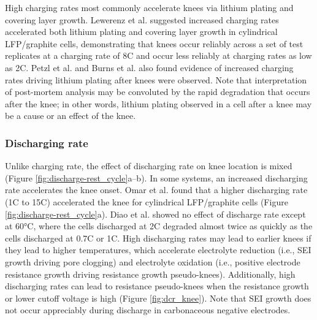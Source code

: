 \documentclass[journal=jpclcd,manuscript=article]{achemso}
\begin{document}
High charging rates most commonly accelerate knees via lithium plating and covering layer growth. Lewerenz et al.\cite{lewerenz_systematic_2017,lewerenz_post-mortem_2017} suggested increased charging rates accelerated both lithium plating and covering layer growth in cylindrical LFP/graphite cells, demonstrating that knees occur reliably across a set of test replicates at a charging rate of 8C and occur less reliably at charging rates as low as 2C. Petzl et al.\cite{petzl_lithium_2015} and Burns et al.\cite{burns_-situ_2015} also found evidence of increased charging rates driving lithium plating after knees were observed. Note that interpretation of post-mortem analysis may be convoluted by the rapid degradation that occurs after the knee; in other words, lithium plating observed in a cell after a knee may be a cause or an effect of the knee.

\subsubsection{Discharging rate}

Unlike charging rate, the effect of discharging rate on knee location is mixed (Figure \ref{fig:discharge-rest_cycle}a--b).
In some systems, an increased discharging rate
accelerates the knee onset.
Omar et al.\cite{omar_lithium_2014} found that a higher discharging rate (1C to 15C) accelerated the knee for cylindrical LFP/graphite cells (Figure \ref{fig:discharge-rest_cycle}a).
Diao et al.\cite{diao_accelerated_2019} showed no effect of discharge rate except at 60°C, where the cells discharged at 2C degraded almost twice as quickly as the cells discharged at 0.7C or 1C.
High discharging rates may lead to earlier knees if they lead to higher temperatures, which accelerate electrolyte reduction (i.e., SEI growth driving pore clogging) and electrolyte oxidation (i.e., positive electrode resistance growth driving resistance growth pseudo-knees). Additionally, high discharging rates can lead to resistance pseudo-knees when the resistance growth or lower cutoff voltage is high (Figure \ref{fig:dcr_knee}).\cite{ma_editors_2019, mandli_analysis_2019}
Note that SEI growth does not occur appreciably during discharge in carbonaceous negative electrodes\cite{attia_electrochemical_2019, das_electrochemical_2019}.
\end{document}
